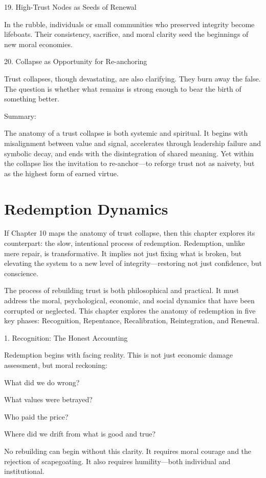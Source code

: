 \documentclass[11pt,oneside]{book}
\begin{document}
19. High-Trust Nodes as Seeds of Renewal


In the rubble, individuals or small communities who preserved integrity become lifeboats. Their consistency, sacrifice, and moral clarity seed the beginnings of new moral economies.

20. Collapse as Opportunity for Re-anchoring


Trust collapses, though devastating, are also clarifying. They burn away the false. The question is whether what remains is strong enough to bear the birth of something better.

Summary:

The anatomy of a trust collapse is both systemic and spiritual. It begins with misalignment between value and signal, accelerates through leadership failure and symbolic decay, and ends with the disintegration of shared meaning. Yet within the collapse lies the invitation to re-anchor—to reforge trust not as naivety, but as the highest form of earned virtue.


\chapter{Redemption Dynamics}

If Chapter 10 maps the anatomy of trust collapse, then this chapter explores its counterpart: the slow, intentional process of redemption. Redemption, unlike mere repair, is transformative. It implies not just fixing what is broken, but elevating the system to a new level of integrity—restoring not just confidence, but conscience.

The process of rebuilding trust is both philosophical and practical. It must address the moral, psychological, economic, and social dynamics that have been corrupted or neglected. This chapter explores the anatomy of redemption in five key phases: Recognition, Repentance, Recalibration, Reintegration, and Renewal.

1. Recognition: The Honest Accounting


Redemption begins with facing reality. This is not just economic damage assessment, but moral reckoning:

    What did we do wrong?

    What values were betrayed?

    Who paid the price?

    Where did we drift from what is good and true?

No rebuilding can begin without this clarity. It requires moral courage and the rejection of scapegoating. It also requires humility—both individual and institutional.
\end{document}
